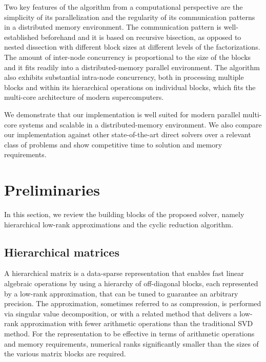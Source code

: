 \documentclass[]{elsarticle}
\begin{document}
Two key features of the algorithm from a computational perspective are the simplicity of its parallelization and the regularity of its communication patterns in a distributed memory environment. The communication pattern is well-established beforehand and it is based on recursive bisection, as opposed to nested dissection with different block sizes at different levels of the factorizations. The amount of inter-node concurrency is proportional to the size of the blocks and it fits readily into a distributed-memory parallel environment. The algorithm also exhibits substantial intra-node concurrency, both in processing multiple blocks and within its hierarchical operations on individual blocks, which fits the multi-core architecture of modern supercomputers.

We demonstrate that our implementation is well suited for modern parallel multi-core systems and scalable in a distributed-memory environment. We also compare our implementation against other state-of-the-art direct solvers over a relevant class of problems and show competitive time to solution and memory requirements.

\section{Preliminaries} 
In this section, we review the building blocks of the proposed solver, namely hierarchical low-rank approximations and the cyclic reduction algorithm. 

\subsection{Hierarchical matrices}

A hierarchical matrix is a data-sparse representation that enables fast linear algebraic operations by using a hierarchy of off-diagonal blocks, each represented by a low-rank approximation, that can be tuned to guarantee an arbitrary precision. The approximation, sometimes referred to as compression, is performed via singular value decomposition, or with a related method that delivers a low-rank approximation with fewer arithmetic operations than the traditional SVD method. For the representation to be effective in terms of arithmetic operations and memory requirements, numerical ranks significantly smaller than the sizes of the various matrix blocks are required.
\end{document}
